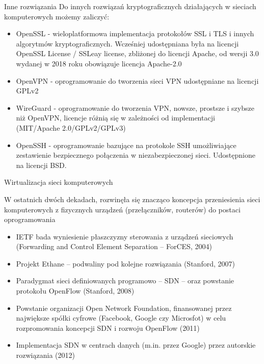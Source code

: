 \documentclass[aspectratio=169]{beamer}
\begin{document}
\begin{frame}{Inne rozwiązania}
    Do innych rozwiązań kryptograficznych działających w sieciach komputerowych możemy zaliczyć:
    \begin{itemize}
        \item OpenSSL - wieloplatformowa implementacja protokołów SSL i TLS i innych algorytmów kryptograficznych. Wcześniej udostępniana była na licencji OpenSSL License / SSLeay license, zbliżonej do licencji Apache, od wersji 3.0 wydanej w 2018 roku obowiązuje licencja Apache-2.0
        \item OpenVPN - oprogramowanie do tworzenia sieci VPN udostępniane na licencji GPLv2
        \item WireGuard - oprogramowanie do tworzenia VPN, nowsze, prostsze i szybsze niż OpenVPN, licencje różnią się w zależności od implementacji (MIT/Apache 2.0/GPLv2/GPLv3)
        \item OpenSSH - oprogramowanie bazujące na protokole SSH umożliwiające zestawienie bezpiecznego połączenia w niezabezpieczonej sieci. Udostępnione na licencji BSD.
    \end{itemize}
\end{frame}

\begin{frame}{Wirtualizacja sieci komputerowych}

W ostatnich dwóch dekadach, rozwinęła się znacząco koncepcja przeniesienia sieci komputerowych z fizycznych urządzeń (przełączników, routerów) do postaci oprogramowania
\begin{itemize}
    \item IETF bada wyniesienie płaszczyzny sterowania z urządzeń sieciowych (Forwarding and Control Element Separation -- ForCES, 2004)
    \item Projekt Ethane -- podwaliny pod kolejne rozwiązania (Stanford, 2007)
    \item Paradygmat sieci definiowanych programowo -- SDN -- oraz powstanie protokołu OpenFlow (Stanford, 2008)
    \item Powstanie organizacji Open Network Foundation, finansowanej przez największe spółki cyfrowe (Facebook, Google czy Microsfot) w celu rozpromowania koncepcji SDN i rozwoju OpenFlow (2011)
    \item Implementacja SDN w centrach danych (m.in. przez Google) przez autorskie rozwiązania (2012)
    
\end{itemize}
\end{frame}
\end{document}
